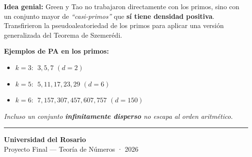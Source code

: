 \documentclass[a4paper,9pt]{article}
\begin{document}
{\begin{minipage}[t]{\dimexpr\linewidth-5mm\relax}
    \vfill
    {\scriptsize\bfseries Idea genial:} {\scriptsize Green y Tao no
    trabajaron directamente con los primos, sino con un conjunto
    mayor de \emph{``casi-primos''} que \textbf{s\'i tiene densidad
    positiva}. Transfirieron la pseudoaleatoriedad de los primos
    para aplicar una versi\'on generalizada del Teorema de
    Szemer\'edi.}

    \vfill
    {\scriptsize\bfseries Ejemplos de PA en los primos:}
    \begin{itemize}
      \item {\scriptsize $k=3$: $\;3,5,7$ \hfill $(d=2)$}
      \item {\scriptsize $k=5$: $\;5,11,17,23,29$ \hfill $(d=6)$}
      \item {\scriptsize $k=6$: $\;7,157,307,457,607,757$ \hfill $(d=150)$}
    \end{itemize}

    \vspace{2pt}
    \begin{tcolorbox}[key]
      {\scriptsize\centering\itshape
      Incluso un conjunto \textbf{infinitamente disperso}
      no escapa al orden aritm\'etico.}
    \end{tcolorbox}

    \vfill
    {\color{Amethyst!30}\rule{\linewidth}{0.4pt}}
    \vspace{2pt}
    {\tiny\color{Navy!55}
      \textbf{Universidad del Rosario}\\
      Proyecto Final — Teor\'ia de N\'umeros · 2026}
  \end{minipage}
}%
\end{document}
